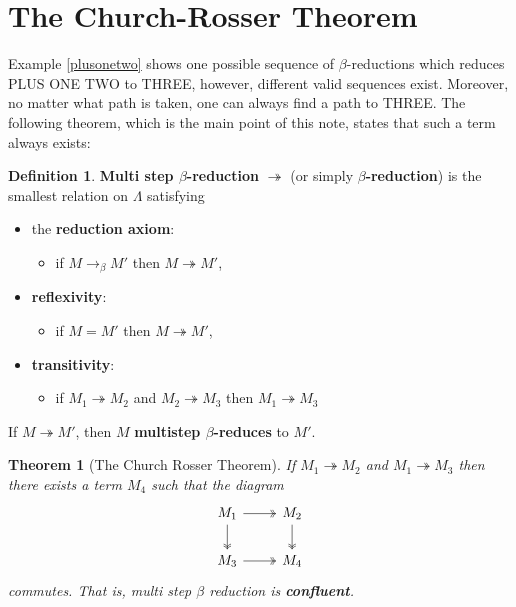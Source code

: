 \documentclass[12pt]{article}
\theoremstyle{plane}
\newtheorem{thm}{Theorem}
\theoremstyle{definition}
\newtheorem{defn}{Definition}
\begin{document}
	\section{The Church-Rosser Theorem}
	Example \ref{plusonetwo} shows one possible sequence of $\beta$-reductions which reduces PLUS ONE TWO to THREE, however, different valid sequences exist. Moreover, no matter what path is taken, one can always find a path to THREE. The following theorem, which is the main point of this note, states that such a term always exists:
	\begin{defn}
		\textbf{Multi step $\beta$-reduction} $\twoheadrightarrow$ (or simply \textbf{$\beta$-reduction}) is the smallest relation on $\Lambda$ satisfying
		\begin{itemize}
			\item the \textbf{reduction axiom}:
			\begin{itemize}
				\item if $M \to_\beta M'$ then $M \twoheadrightarrow M'$,
			\end{itemize}
			\item \textbf{reflexivity}:
			\begin{itemize}
				\item if $M = M'$ then $M \twoheadrightarrow M'$,
			\end{itemize}
			\item \textbf{transitivity}:
			\begin{itemize}
				\item if $M_1 \twoheadrightarrow M_2$ and $M_2 \twoheadrightarrow M_3$ then $M_1 \twoheadrightarrow M_3$
			\end{itemize}
		\end{itemize}
		If $M \twoheadrightarrow M'$, then $M$ \textbf{multistep $\beta$-reduces} to $M'$.
	\end{defn}
	\begin{thm}[The Church Rosser Theorem]
		If $M_1 \twoheadrightarrow M_2$ and $M_1 \twoheadrightarrow M_3$ then there exists a term $M_4$ such that the diagram
		\[
		\begin{tikzcd}
			M_1\arrow[r,twoheadrightarrow]\arrow[d,twoheadrightarrow] & M_2\arrow[d,twoheadrightarrow]\\
			M_3\arrow[r,twoheadrightarrow] & M_4
		\end{tikzcd}
		\]
		commutes. That is, multi step $\beta$ reduction is \textbf{confluent}.
	\end{thm}
\end{document}

